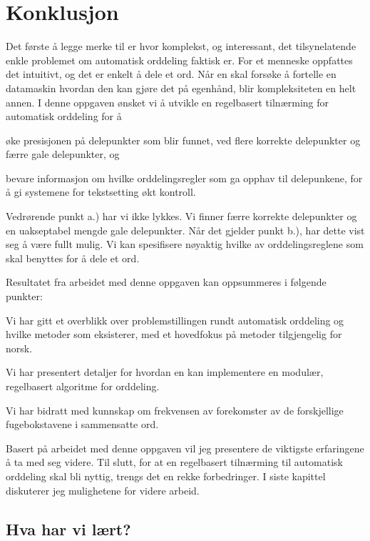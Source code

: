 \chapter{Konklusjon}
\label{sec:konklusjon}

Det første å legge merke til er hvor komplekst, og interessant, det tilsynelatende enkle problemet om automatisk orddeling faktisk er. For et menneske oppfattes det intuitivt, og det er enkelt å dele et ord. Når en skal forsøke å fortelle en datamaskin hvordan den kan gjøre det på egenhånd, blir kompleksiteten en helt annen. I denne oppgaven ønsket vi å utvikle en regelbasert tilnærming for automatisk orddeling for å
\begin{inparaenum}
\item øke presisjonen på delepunkter som blir funnet, ved flere korrekte delepunkter og færre gale delepunkter, og 
\item bevare informasjon om hvilke orddelingsregler som ga opphav til delepunkene, for å gi systemene for tekstsetting økt kontroll.
\end{inparaenum}
Vedrørende punkt a.) har vi ikke lykkes. Vi finner færre korrekte delepunkter og en uakseptabel mengde gale delepunkter. Når det gjelder punkt b.), har dette vist seg å være fullt mulig. Vi kan spesifisere nøyaktig hvilke av orddelingsreglene som skal benyttes for å dele et ord.

Resultatet fra arbeidet med denne oppgaven kan oppsummeres i følgende punkter:
\begin{enum}
\item Vi har gitt et overblikk over problemstillingen rundt automatisk orddeling og hvilke metoder som eksisterer, med et hovedfokus på metoder tilgjengelig for norsk. 
\item Vi har presentert detaljer for hvordan en kan implementere en modulær, regelbasert algoritme for orddeling. 
\item Vi har bidratt med kunnskap om frekvensen av forekomster av de forskjellige fugebokstavene i sammensatte ord.
\end{enum}

Basert på arbeidet med denne oppgaven vil jeg presentere de viktigste erfaringene å ta med seg videre. Til slutt, for at en regelbasert tilnærming til automatisk orddeling skal bli nyttig, trengs det en rekke forbedringer. I siste kapittel diskuterer jeg mulighetene for videre arbeid.

\section{Hva har vi lært?}

